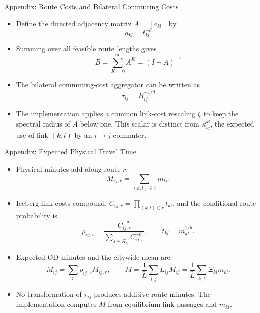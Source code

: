 \documentclass[11pt,aspectratio=169]{beamer}
\newcommand{\navback}[1]{\par\vspace{0.35em}\noindent\hfill\hyperlink{#1}{\beamerreturnbutton{back}}}
\begin{document}
\begin{frame}[label=approute]{Appendix: Route Costs and Bilateral Commuting Costs}
\begin{itemize}\small
  \item Define the directed adjacency matrix $A=[a_{kl}]$ by
  \vspace{-0.5em}\begin{equation}
    a_{kl} = t_{kl}^{-\theta}
  \end{equation}
  \item Summing over all feasible route lengths gives
  \vspace{-0.5em}\begin{equation}
    B = \sum_{K=0}^{\infty}A^K = (I-A)^{-1}
  \end{equation}
  \item The bilateral commuting-cost aggregator can be written as
  \vspace{-0.5em}\begin{equation}\label{eq:inverse}
    \tau_{ij} = B_{ij}^{-1/\theta}
  \end{equation}
  \vspace{-0.5em}
  \item The implementation applies a common link-cost rescaling $\zeta$ to keep the spectral radius of $A$ below one. This scalar is distinct from $\kappa_{ij}^{kl}$, the expected use of link $(k,l)$ by an $i\to j$ commuter.
\end{itemize}
\navback{bilateral}
\end{frame}

\begin{frame}[label=appphysicaltime]{Appendix: Expected Physical Travel Time}
\scriptsize
\begin{itemize}\setlength\itemsep{0.45em}
  \item Physical minutes add along route $r$:
  \vspace{-0.35em}
  \[
    M_{ij,r}=\sum_{(k,l)\in r}m_{kl}.
  \]
  \vspace{-0.75em}
  \item Iceberg link costs compound, $C_{ij,r}=\prod_{(k,l)\in r}t_{kl}$, and the conditional route probability is
  \vspace{-0.35em}
  \[
    \rho_{ij,r}=\frac{C_{ij,r}^{-\theta}}{\sum_{s\in\mathcal R_{ij}}C_{ij,s}^{-\theta}},
    \qquad t_{kl}=m_{kl}^{1/\theta}.
  \]
  \vspace{-0.75em}
  \item Expected OD minutes and the citywide mean are
  \vspace{-0.35em}
  \[
    M_{ij}=\sum_r\rho_{ij,r}M_{ij,r},
    \qquad
    \bar M=\frac{1}{\bar L}\sum_{i,j}L_{ij}M_{ij}
    =\frac{1}{\bar L}\sum_{k,l}\Xi_{kl}m_{kl}.
  \]
  \vspace{-0.75em}
  \item No transformation of $\tau_{ij}$ produces additive route minutes. The implementation computes $\bar M$ from equilibrium link passages and $m_{kl}$.
\end{itemize}
\navback{result2}
\end{frame}
\end{document}
